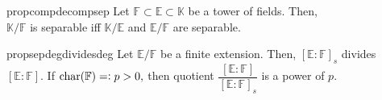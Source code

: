 \begin{restatable}[]{prop}{compdecompsep}
\label{prop:compdecompsep}
    Let $\mathbb{F} \subset \mathbb{E} \subset \mathbb{K}$ be a tower of fields. Then,\\
    $\mathbb{K}/\mathbb{F}$ is separable iff $\mathbb{K}/\mathbb{E}$ and $\mathbb{E}/\mathbb{F}$ are separable. \hfill\hyperref[prop:compdecompsep2]{\downsym}
\end{restatable}

\begin{restatable}[]{prop}{sepdegdividesdeg}
\label{prop:sepdegdividesdeg}
    Let $\mathbb{E}/\mathbb{F}$ be a finite extension. Then, $[\mathbb{E} : \mathbb{F}]_s$ divides $[\mathbb{E} : \mathbb{F}].$ If $\operatorname{char}(\mathbb{F}) =\vcentcolon p > 0,$ then quotient $\dfrac{[\mathbb{E} : \mathbb{F}]}{[\mathbb{E} : \mathbb{F}]_s}$ is a power of $p.$ \hfill\hyperref[prop:sepdegdividesdeg2]{\downsym}
\end{restatable}

